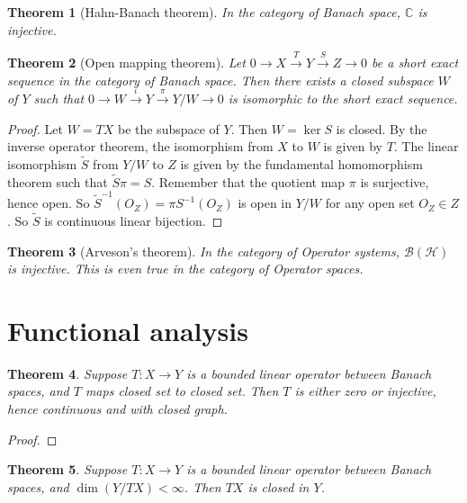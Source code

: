 \documentclass{article}
\newtheorem{theorem}{Theorem}[section]
\begin{document}
\begin{theorem}[Hahn-Banach theorem]
In the category of Banach space, $\mathbb{C}$ is injective.
\end{theorem}

\begin{theorem}[Open mapping theorem]
Let $0 \to X \xrightarrow{T} Y \xrightarrow{S} Z \to 0$ be a short exact sequence in the category of Banach space. Then there exists a closed subspace $W$ of $Y$ such that $0 \to W \xrightarrow{\iota} Y \xrightarrow{\pi} Y/W \to 0$ is isomorphic to the short exact sequence.
\end{theorem}

\begin{proof}
Let $W=TX$ be the subspace of $Y$. Then $W = \ker S$ is closed. By the inverse operator theorem, the isomorphism from $X$ to $W$ is given by $T$.
The linear isomorphism $\tilde{S}$ from $Y/W$ to $Z$ is given by the fundamental homomorphism theorem such that $\tilde{S} \pi = S$. Remember that the quotient map $\pi$ is surjective, hence open.
So $\tilde{S}^{-1} (O_Z) = \pi S^{-1} (O_Z)$ is open in $Y/W$ for any open set $O_Z \in Z$. So $\tilde{S}$ is continuous linear bijection.
\end{proof}

\begin{theorem}[Arveson's theorem]
In the category of Operator systems, $\mathcal{B}(\mathcal{H})$ is injective. This is even true in the category of Operator spaces.
\end{theorem}


\section{Functional analysis}

\begin{theorem}
Suppose $T:X\to Y$ is a bounded linear operator between Banach spaces, and $T$ maps closed set to closed set. Then $T$ is either zero or injective, hence continuous and with closed graph.
\end{theorem}

\begin{proof}

\end{proof}

\begin{theorem}
Suppose $T:X\to Y$ is a bounded linear operator between Banach spaces, and $\dim (Y/ TX) < \infty$. Then $TX$ is closed in $Y$.
\end{theorem}
\end{document}
